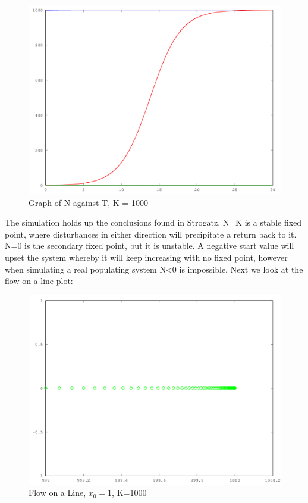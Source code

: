 \documentclass{article}
\begin{document}
\begin{enumerate}
\begin{figure}[H]
			\caption{Graph of N against T, K = 1000}
			\includegraphics[width=\textwidth]{growthFunction}
		\end{figure}
		
		The simulation holds up the conclusions found in Strogatz. N=K is a stable fixed point, where disturbances in either direction will precipitate a return back to it. N=0 is the secondary fixed point, but it is unstable. A negative start value will upset the system whereby it will keep increasing with no fixed point, however when simulating a real populating system N<0 is impossible. Next we look at the flow on a line plot:
		\begin{figure}[H]
			\caption{Flow on a Line, $x_0=1$, K=1000 }
			\includegraphics[width=\textwidth]{growthFunction3}
		\end{figure}
		

\end{enumerate}
\end{document}
